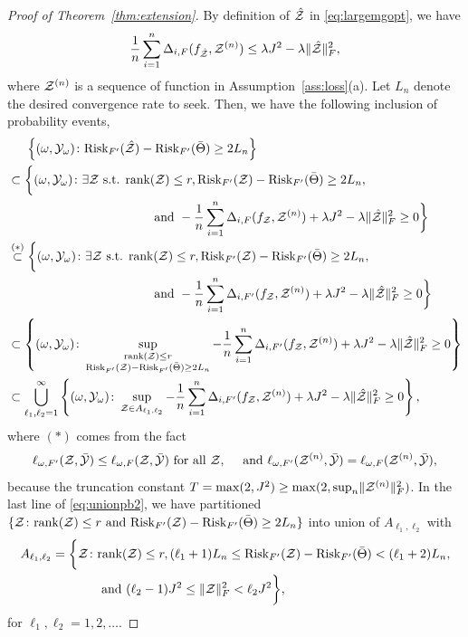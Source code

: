 \documentclass[twoside,11pt]{article}
\theoremstyle{plain}
\theoremstyle{definition}
\def\risk{\textup{Risk}}
\begin{document}
\begin{proof}[Proof of Theorem~\ref{thm:extension}]
By definition of $\hat {\mathcal{Z}}$ in \eqref{eq:largemgopt}, we have 
\[ \frac{1}{n}\sum_{i=1}^n \Delta_{i,F}(f_{\hat {\mathcal{Z}}},\mathcal{Z}^{(n)})\leq \lambda J^2-\lambda\lVert\hat{\mathcal{Z}}\rVert_F^2,\] where $\mathcal{Z}^{(n)}$ is a sequence of function in Assumption~\ref{ass:loss}(a).
Let $L_n$ denote the desired convergence rate to seek.  Then, we have the following inclusion of probability events,
\begin{align}\label{eq:unionpb2}
&\hspace{.5cm}\left\{(\omega,\tY_{\omega})\colon \risk_{F'}(\hat \tZ)-\risk_{F'}(\bar\Theta)\geq 2L_n \right\}\nonumber\\
&\subset\bigg\{(\omega,\tY_{\omega})\colon\exists \tZ \text{ s.t. } \text{rank}(\tZ)\leq r,  \risk_{F'}(\tZ)-\risk_{F'}(\bar\Theta)\geq2 L_n,\nonumber
\\& \hspace{4cm}\text{ and } -\frac{1}{n}\sum_{i=1}^n\Delta_{i,F}(f_\tZ,\tZ^{(n)})+\lambda J^2-\lambda\FnormSize{}{\hat\tZ}^2\geq 0 \bigg\}\nonumber\\
&\stackrel{(*)}{\subset}\bigg\{(\omega,\tY_{\omega})\colon\exists \tZ \text{ s.t. } \text{rank}(\tZ)\leq r,  \risk_{F'}(\tZ)-\risk_{F'}(\bar\Theta)\geq2 L_n,\nonumber
\\& \hspace{4cm}\text{ and } -\frac{1}{n}\sum_{i=1}^n\Delta_{i,F'}(f_\tZ,\tZ^{(n)})+\lambda J^2-\lambda\FnormSize{}{\hat\tZ}^2\geq 0 \bigg\}\nonumber\\
&\subset \left\{(\omega,\tY_{\omega})\colon\sup_{\substack{\text{rank}(\tZ)\leq r\\  
\risk_{F'}(\tZ)-\risk_{F'}(\bar\Theta)\geq 2L_n  }}-\frac{1}{n}\sum_{i=1}^n\Delta_{i,F'}(f_\tZ,\tZ^{(n)})+\lambda J^2-\lambda\FnormSize{}{\hat\tZ}^2\geq 0\right\}\nonumber\\
&\subset \bigcup_{\ell_1,\ell_2=1}^{\infty}\left\{(\omega,\tY_\omega)\colon \sup_{\tZ\in A_{\ell_1,\ell_2}}-\frac{1}{n}\sum_{i=1}^n\Delta_{i,F'}(f_\tZ,\tZ^{(n)})+\lambda J^2-\lambda\FnormSize{}{\hat\tZ}^2\geq 0\right\},
\end{align}
where  $(*)$ comes from the fact
 \begin{align}
 \ell_{\omega,F'}(\mathcal{Z},\bar{\mathcal{Y}})\leq \ell_{\omega,F}(\mathcal{Z},\bar{\mathcal{Y}}) \text{ for all } \mathcal{Z},\quad  \text{ and }   \ell_{\omega,F'}(\mathcal{Z}^{(n)},\bar{\mathcal{Y}})= \ell_{\omega,F}(\mathcal{Z}^{(n)},\bar{\mathcal{Y}}), 
 \end{align}
 because the truncation constant $T = \max(2,J^2)\geq \max(2,\sup_n\lVert\mathcal{Z}^{(n)}\rVert_F^2)$.
In the last line of \eqref{eq:unionpb2}, we have partitioned $\{\tZ\colon \text{rank}(\tZ)\leq r \text{ and } \risk_{F'}(\tZ)-\risk_{F'}(\bar\Theta)\geq 2L_n\}$ into union of $A_{\ell_1,\ell_2}$ with 
\begin{align}
A_{\ell_1,\ell_2} = \bigg\{\tZ\colon &\text{rank}(\tZ)\leq r, (\ell_1+1) L_n\leq  \risk_{F'}(\tZ)-\risk_{F'}(\bar\Theta)<(\ell_1+2)L_n,\\
&\text{ and } (\ell_2-1)J^2\leq \FnormSize{}{\tZ}^2<\ell_2 J^2\bigg\},
\end{align}
for $\ell_1,\ell_2 = 1,2,\ldots$. 



\end{proof}
\end{document}
